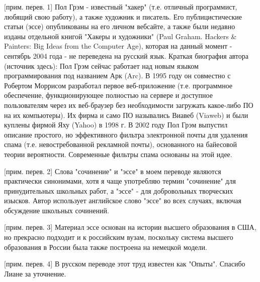 \documentclass[ebook,12pt,oneside,openany]{memoir}
\begin{document}
[прим. перев. 1] Пол Грэм - известный "хакер" (т.е. отличный
программист, любящий свою работу), а также художник и писатель. Его
публицистические статьи (эссе) опубликованы на его личном вебсайте, а
также были недавно изданы отдельной книгой "Хакеры и художники" (Paul
Graham. Hackers \& Painters: Big Ideas from the Computer Age), которая
на данный момент - сентябрь 2004 года - не переведена на русский язык.
Краткая биография автора (источник здесь): Пол Грэм сейчас работает
над новым языком программирования под названием Арк (Arc). В 1995 году
он совместно с Робертом Моррисом разработал первое веб-приложение
(т.е. программное обеспечение, функционирующее полностью на сервере и
доступное пользователям через их веб-браузер без необходимости
загружать какое-либо ПО на их компьютеры). Их фирма и само ПО
назывались Виавеб (Viaweb) и были куплены фирмой Яху (Yahoo) в 1998 г.
В 2002 году Пол Грэм выпустил описание простого, но эффективного
фильтра электронной почты для удаления спама (т.е. невостребованной
рекламной почты), основанного на байесовой теории вероятности.
Современные фильтры спама основаны на этой идее. \newline

[прим. перев. 2] Слова "сочинение" и "эссе" в моем переводе являются
практически синонимами, хотя я чаще употребляю термин "сочинение" для
принудительных школьных работ, а "эссе" - для добровольных творческих
изысков. Автор использует английское слово "эссе" во всех случаях,
включая обсуждение школьных сочинений. \newline

[прим. перев. 3] Материал эссе основан на истории высшего образования
в США, но прекрасно подходит и к российским вузам, поскольку система
высшего образования в России была также построена на немецкой модели.
\newline

[прим. перев. 4] В русском переводе этот труд известен как "Опыты".
Спасибо Лиане за уточнение.
\end{document}
